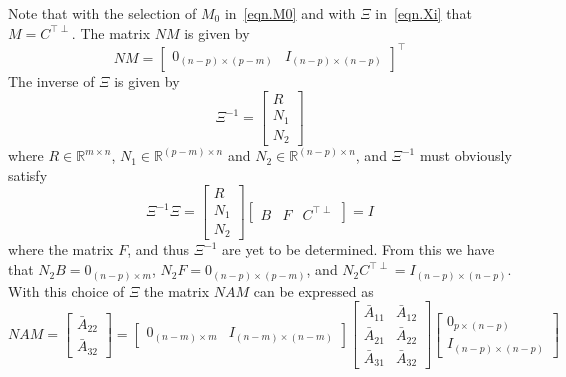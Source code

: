 \documentclass[]{../sty/aiaa-tc}
\begin{document}
  Note that with the selection of $M_{0}$ in\ \eqref{eqn.M0} and with $\Xi$ in\ \eqref{eqn.Xi} that $M=C^{\top\perp}$.
  The matrix $NM$ is given by
  \begin{equation}
    \label{eqn.NM}
    NM=
    \begin{bmatrix}
      0_{(n-p)\times(p-m)} & I_{(n-p)\times(n-p)}
    \end{bmatrix}^{\top}
  \end{equation}
  The inverse of $\Xi$ is given by
  \begin{equation}
    \label{eqn.Xiinv}
    \Xi^{-1}=
    \begin{bmatrix}
      R \\
      N_{1} \\
      N_{2}
    \end{bmatrix}
  \end{equation}
  where $R\in\mathbb{R}^{m\times n}$, $N_{1}\in\mathbb{R}^{(p-m)\times n}$ and $N_{2}\in\mathbb{R}^{(n-p)\times n}$, and $\Xi^{-1}$ must obviously satisfy
  \begin{equation*}
    \Xi^{-1}\Xi=
    \begin{bmatrix}
      R \\
      N_{1} \\
      N_{2}
    \end{bmatrix}
    \begin{bmatrix}
      B & F & C^{\top\perp}
    \end{bmatrix}=
    I
  \end{equation*}
  where the matrix $F$, and thus $\Xi^{-1}$ are yet to be determined.
  From this we have that $N_{2}B=0_{(n-p)\times m} $, $N_{2}F=0_{(n-p)\times(p-m)}$, and $N_{2}C^{\top\perp}=I_{(n-p)\times(n-p)}$.
  With this choice of $\Xi$ the matrix $NAM$ can be expressed as
  \begin{equation}
    \label{eqn.NAM}
    NAM=
    \begin{bmatrix}
      \bar{A}_{22} \\
      \bar{A}_{32}
    \end{bmatrix}=
    \begin{bmatrix}
      0_{(n-m)\times m} & I_{(n-m)\times(n-m)}
    \end{bmatrix}
    \left[
    \begin{array}{c|c} %
      \bar{A}_{11} & \bar{A}_{12} \\
      \hline %
      \bar{A}_{21} & \bar{A}_{22} \\
      \hline %
      \bar{A}_{31} & \bar{A}_{32}
    \end{array}\right]
    \begin{bmatrix}
      0_{p\times(n-p)} \\ I_{(n-p)\times(n-p)}
    \end{bmatrix}
  \end{equation}
\end{document}
